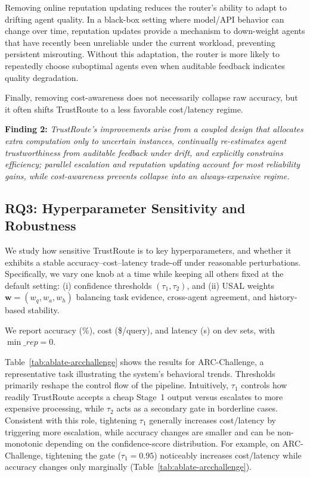 \documentclass[acmsmall,screen,review,anonymous]{acmart}
\begin{document}
Removing online reputation updating reduces the router's ability to adapt to drifting agent quality.
In a black-box setting where model/API behavior can change over time, reputation updates provide a mechanism to down-weight agents that have recently been unreliable under the current workload, preventing persistent misrouting.
Without this adaptation, the router is more likely to repeatedly choose suboptimal agents even when auditable feedback indicates quality degradation.

Finally, removing cost-awareness does not necessarily collapse raw accuracy, but it often shifts TrustRoute to a less favorable cost/latency regime.
\begin{findingbox}
\textbf{Finding 2:} \textit{TrustRoute's improvements arise from a coupled design that allocates extra computation only to uncertain instances, continually re-estimates agent trustworthiness from auditable feedback under drift, and explicitly constrains efficiency; parallel escalation and reputation updating account for most reliability gains, while cost-awareness prevents collapse into an always-expensive regime.}
\end{findingbox}
\subsection{RQ3: Hyperparameter Sensitivity and Robustness}
\label{sec:rq3}
We study how sensitive TrustRoute is to key hyperparameters, and whether it exhibits a stable accuracy--cost--latency trade-off under reasonable perturbations.
Specifically, we vary one knob at a time while keeping all others fixed at the default setting:
(i) confidence thresholds $(\tau_1,\tau_2)$, and
(ii) USAL weights $\mathbf{w}=(w_q,w_a,w_h)$ balancing task evidence, cross-agent agreement, and history-based stability.

We report accuracy (\%), cost (\$/query), and latency (s) on dev sets, with $\min\_rep=0$.

Table~\ref{tab:ablate-arcchallenge} shows the results for ARC-Challenge, a representative task illustrating the system's behavioral trends.
Thresholds primarily reshape the control flow of the pipeline.
Intuitively, $\tau_1$ controls how readily TrustRoute accepts a cheap Stage~1 output versus escalates to more expensive processing, while $\tau_2$ acts as a secondary gate in borderline cases.
Consistent with this role, tightening $\tau_1$ generally increases cost/latency by triggering more escalation, while accuracy changes are smaller and can be non-monotonic depending on the confidence-score distribution.
For example, on ARC-Challenge, tightening the gate ($\tau_1{=}0.95$) noticeably increases cost/latency while accuracy changes only marginally (Table~\ref{tab:ablate-arcchallenge}).
\end{document}

